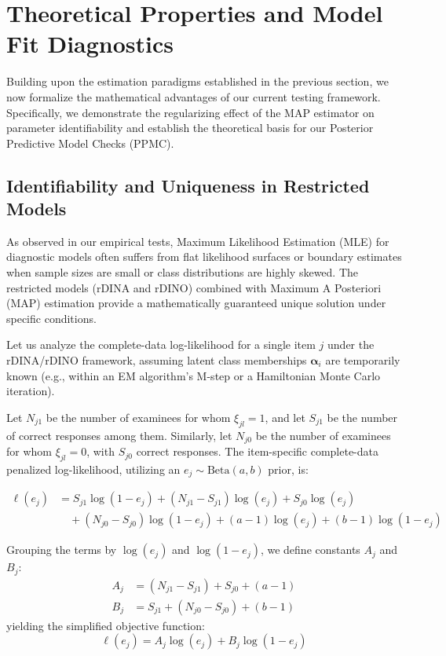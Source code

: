 \documentclass[11pt,a4paper]{article}
\begin{document}
\section{Theoretical Properties and Model Fit Diagnostics}

Building upon the estimation paradigms established in the previous section, 
we now formalize the mathematical advantages of our current testing framework. 
Specifically, we demonstrate the regularizing effect of the MAP estimator 
on parameter identifiability and establish the theoretical basis for our 
Posterior Predictive Model Checks (PPMC).

\subsection{Identifiability and Uniqueness in Restricted Models}

As observed in our empirical tests, Maximum Likelihood Estimation (MLE) 
for diagnostic models often suffers from flat likelihood surfaces or 
boundary estimates when sample sizes are small or class distributions 
are highly skewed. The restricted models (rDINA and rDINO) combined with 
Maximum A Posteriori (MAP) estimation provide a mathematically guaranteed 
unique solution under specific conditions.

Let us analyze the complete-data log-likelihood for a single item $j$ 
under the rDINA/rDINO framework, assuming latent class memberships $\boldsymbol{\alpha}_i$ 
are temporarily known (e.g., within an EM algorithm's M-step or a 
Hamiltonian Monte Carlo iteration). 

Let $N_{j1}$ be the number of examinees for whom $\xi_{jl} = 1$, 
and let $S_{j1}$ be the number of correct responses among them. 
Similarly, let $N_{j0}$ be the number of examinees for whom $\xi_{jl} = 0$, 
with $S_{j0}$ correct responses. 
The item-specific complete-data penalized log-likelihood, 
utilizing an $e_j \sim \text{Beta}(a, b)$ prior, is:

\begin{equation}
\begin{split}
    \ell(e_j) &= S_{j1} \log(1 - e_j) + (N_{j1} - S_{j1}) \log(e_j) 
    + S_{j0} \log(e_j) \\
    &\quad + (N_{j0} - S_{j0}) \log(1 - e_j) 
    + (a - 1)\log(e_j) + (b - 1)\log(1 - e_j)
\end{split}
\end{equation}

Grouping the terms by $\log(e_j)$ and $\log(1-e_j)$, 
we define constants $A_j$ and $B_j$:
\begin{align*}
    A_j &= (N_{j1} - S_{j1}) + S_{j0} + (a - 1) \\
    B_j &= S_{j1} + (N_{j0} - S_{j0}) + (b - 1)
\end{align*}
yielding the simplified objective function:
\begin{equation}
    \ell(e_j) = A_j \log(e_j) + B_j \log(1 - e_j)
\end{equation}
\end{document}
